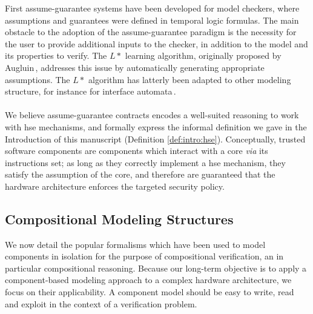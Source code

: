 First assume-guarantee systems have been developed for model checkers, where
assumptions and guarantees were defined in temporal logic formulas.
%
The main obstacle to the adoption of the assume-guarantee paradigm is the
necessity for the user to provide additional inputs to the checker, in addition
to the model and its properties to verify.
%
The \( L* \) learning algorithm, originally proposed by
Augluin\,\cite{angluin1987lstart}, addresses this issue by automatically
generating appropriate assumptions.
%
The \( L* \) algorithm has latterly been adapted to other modeling structure,
for instance for interface automata\,\cite{emmi2008assume}.

\paragraph*{}
%
We believe assume-guarantee contracts encodes a well-suited reasoning to work
with \ac{hse} mechanisms, and formally express the informal definition we gave
in the Introduction of this manuscript (Definition \ref{def:intro:hse}).
%
Conceptually, trusted software components are components which interact with a
core \emph{via} its instructions set; as long as they correctly implement a
\ac{hse} mechanism, they satisfy the assumption of the core, and therefore are
guaranteed that the hardware architecture enforces the targeted security policy.

\subsection{Compositional Modeling Structures}
\label{subsec:sota:compmod}

We now detail the popular formalisms which have been used to model components in
isolation for the purpose of compositional verification, an in particular
compositional reasoning.
%
Because our long-term objective is to apply a component-based modeling approach
to a complex hardware architecture, we focus on their applicability.
%
A component model should be easy to write, read and exploit in the context of a
verification problem.

